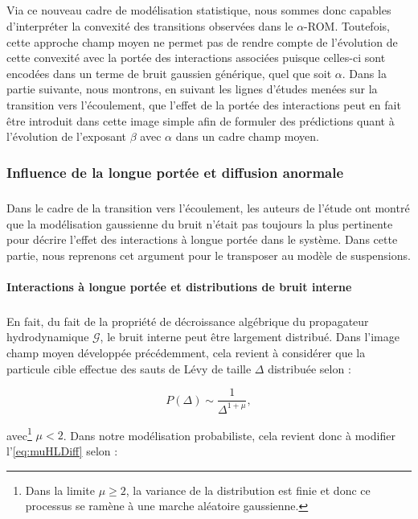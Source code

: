 \subparagraph{}Via ce nouveau cadre de modélisation statistique, nous sommes donc capables d'interpréter la convexité des transitions observées dans le $\alpha$-ROM. Toutefois, cette approche champ moyen ne permet pas de rendre compte de l'évolution de cette convexité avec la portée des interactions associées puisque celles-ci sont encodées dans un terme de bruit gaussien générique, quel que soit $\alpha$. Dans la partie suivante, nous montrons, en suivant les lignes d'études menées sur la transition vers l'écoulement, que l'effet de la portée des interactions peut en fait être introduit dans cette image simple afin de formuler des prédictions quant à l'évolution de l'exposant $\beta$ avec $\alpha$ dans un cadre champ moyen.
 
\subsubsection{Influence de la longue portée et diffusion anormale}

\label{sec:LPHL}

\subparagraph{}Dans le cadre de la transition vers l'écoulement, les auteurs de l'étude \cite{lin_mean-field_2016} ont montré que la modélisation gaussienne du bruit n'était pas toujours la plus pertinente pour décrire l'effet des interactions à longue portée dans le système. Dans cette partie, nous reprenons cet argument pour le transposer au modèle de suspensions.

\paragraph{Interactions à longue portée et distributions de bruit interne}

\subparagraph{}En fait, du fait de la propriété de décroissance algébrique du propagateur hydrodynamique $ \mathcal{G}$, le bruit interne peut être largement distribué. Dans l'image champ moyen développée précédemment, cela revient à considérer que la particule cible effectue des sauts de Lévy de taille $\Delta$ distribuée selon :

\begin{equation}
	P(\Delta) \sim \frac{1}{\Delta^{1+\mu}},
\end{equation}

\noindent avec\footnote{Dans la limite $\mu \geq 2$, la variance de la distribution est finie et donc ce processus se ramène à une marche aléatoire gaussienne.} $\mu < 2$. Dans notre modélisation probabiliste, cela revient donc à modifier l'\autoref{eq:muHLDiff} selon :

